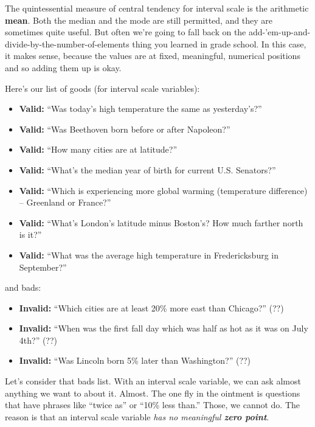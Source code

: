 The quintessential measure of central tendency for interval scale is the
arithmetic \textbf{mean}. Both the median and the mode are still permitted, and
they are sometimes quite useful. But often we're going to fall back on the
add-'em-up-and-divide-by-the-number-of-elements thing you learned in grade
school. In this case, it makes sense, because the values are at fixed,
meaningful, numerical positions and so adding them up is okay.

Here's our list of goods (for interval scale variables):

\begin{itemize}[nosep]
\item \textbf{Valid:} ``Was today's high temperature the same as yesterday's?''
\item \textbf{Valid:} ``Was Beethoven born before or after Napoleon?''
\item \textbf{Valid:} ``How many cities are at  latitude?''
\item \textbf{Valid:} ``What's the median year of birth for current U.S. Senators?''
\item \textbf{Valid:} ``Which is experiencing more global warming
(temperature difference) -- Greenland or France?''
\item \textbf{Valid:} ``What's London's latitude minus Boston's? How much
farther north is it?''
\item \textbf{Valid:} ``What was the average high temperature in Fredericksburg
in September?''
\end{itemize}

and bads:

\begin{itemize}[nosep]
\item \textbf{Invalid:} ``Which cities are at least 20\% more east than
Chicago?'' (??)
\item \textbf{Invalid:} ``When was the first fall day which was half as hot as
it was on July 4th?'' (??)
\item \textbf{Invalid:} ``Was Lincoln born 5\% later than Washington?'' (??)
\end{itemize}

Let's consider that bads list. With an interval scale variable, we can ask
almost anything we want to about it. Almost. The one fly in the ointment is
questions that have phrases like ``twice as'' or ``10\% less than.'' Those, we
cannot do. The reason is that an interval scale variable \textit{has no
meaningful \textbf{zero point}}.

